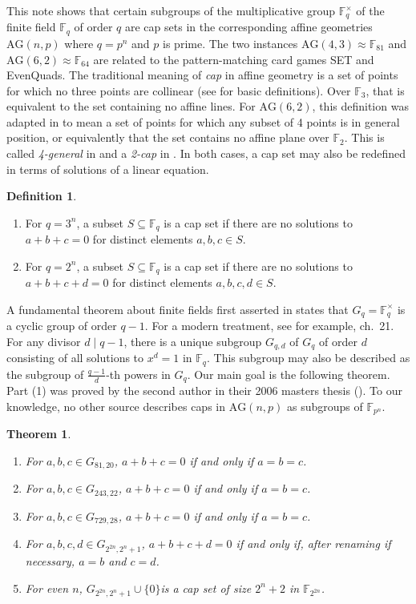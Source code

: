 \documentclass[12pt]{amsart}
\newtheorem{thm}{Theorem}
\theoremstyle{definition}
\newtheorem{defn}{Definition}
\begin{document}
This note shows that certain subgroups of the multiplicative group
$\mathbb{F}_q^\times$ of the finite field $\mathbb{F}_q$ of order $q$
are cap sets in the corresponding affine geometries $\text{AG}(n,p)$
where $q=p^n$ and $p$ is prime.  The two instances
$\text{AG}(4,3)\approx \mathbb{F}_{81}$ and
$\text{AG}(6,2)\approx \mathbb{F}_{64}$ are related to the
pattern-matching card games SET and EvenQuads.  The traditional
meaning of \emph{cap} in affine geometry is a set of points for which
no three points are collinear (see \cite{Hill1978} for basic
definitions). Over $\mathbb{F}_3$, that is equivalent to the set
containing no affine lines.  For $\text{AG}(6,2)$, this definition was
adapted in \cite{HowManyCardsEvenQuads2023} to mean a set of points
for which any subset of 4 points is in general position, or
equivalently that the set contains no affine plane over
$\mathbb{F}_2$.  This is called \emph{4-general} in \cite{Bennett2019}
and a \emph{2-cap} in \cite{HuangTaitWon2019}. In both cases, a cap
set may also be redefined in terms of solutions of a linear equation.
\begin{defn}
  \begin{enumerate}
  \item For $q=3^n$, a subset $S\subseteq \mathbb{F}_q$ is a cap set
    if there are no solutions to $a+b+c=0$ for distinct elements
    $a,b,c\in S$.
  \item For $q=2^n$, a subset $S\subseteq \mathbb{F}_q$ is a cap set
    if there are no solutions to $a+b+c+d=0$ for distinct elements
    $a,b,c,d\in S$.
  \end{enumerate}
\end{defn}

A fundamental theorem about finite fields first asserted in
\cite{Galois1830} states that $G_q=\mathbb{F}_q^\times$ is a cyclic
group of order $q-1$.  For a modern treatment, see for example,
\cite{Gallian10th} ch.~21. For any divisor $d\mid q-1$, there is a
unique subgroup $G_{q,d}$ of $G_q$ of order $d$ consisting of all
solutions to $x^d=1$ in $\mathbb{F}_q$. This subgroup may also be
described as the subgroup of $\frac{q-1}{d}$-th powers in $G_q$.  Our
main goal is the following theorem.  Part (1) was proved by the second
author in their 2006 masters thesis (\cite{Mills2006}).  To our
knowledge, no other source describes caps in $\text{AG}(n,p)$ as
subgroups of $\mathbb{F}_{p^n}$.

\begin{thm}
  \begin{enumerate}
  \item For $a,b,c\in G_{81,20}$, $a+b+c=0$ if and only if $a=b=c$.
  \item For
    $a,b,c\in G_{243,22}$, $a+b+c=0$ if and only if $a=b=c$.
  \item For
    $a,b,c\in G_{729,28}$, $a+b+c=0$ if and only if $a=b=c$.
  \item For $a,b,c,d\in G_{2^{2n},2^n+1}$, $a+b+c+d=0$
    if and only if, after renaming if necessary, $a=b$ and
    $c=d$.
  \item For even $n$, $G_{2^{2n},2^n+1}\cup\{0\}$is a cap set of size
    $2^n+2$ in $\mathbb{F}_{2^{2n}}$.
  \end{enumerate}
\end{thm}
\end{document}
